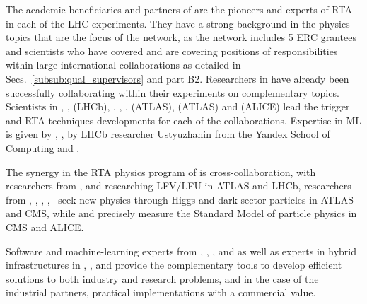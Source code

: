 The academic beneficiaries and partners of \acronym are the pioneers and experts of RTA in each of the LHC experiments. 
They have a strong background in the physics topics that are the focus of the network, as the network includes 5 ERC grantees and scientists who have covered and are covering positions of responsibilities within large international collaborations as detailed in Secs.~\ref{subsub:qual_supervisors} and part B2.
Researchers in \acronym have already been successfully collaborating within their experiments on complementary topics. 
Scientists in \nikhefentity, \cnrsentity, \dortmundentity (LHCb), \oregonentity, \ohioentity, \lundentity, \heidelbergentity (ATLAS), \helsinkientity (ATLAS)  and \lundentity (ALICE) lead the trigger and RTA techniques developments for each of the collaborations. 
Expertise in ML is given by \pointeightentity, \unigeentity, by LHCb researcher Ustyuzhanin from the Yandex School of Computing and \yandexentity.  

The synergy in the RTA physics program of \acronym is cross-collaboration, with researchers from \nikhefentity, \cnrsentity and \dortmundentity researching LFV/LFU in ATLAS and LHCb, researchers from \unigeentity, \cernentity, \helsinkientity, \heidelbergentity, \ seek new physics through Higgs and dark sector particles in ATLAS and CMS, while \lundentity and \helsinkientity precisely measure the Standard Model of particle physics in CMS and ALICE. 

Software and machine-learning experts from \pointeightentity, \ximantisentity, \heidelberginstrumentsentity, \cernentity and \ibmentity as well as experts in hybrid infrastructures in \pisaentity, \cnrsentity, \fleetmaticsentity and \lightboxentity provide the complementary tools to develop efficient solutions to both industry and research problems, and in the case of the industrial partners, practical implementations with a commercial value. 


